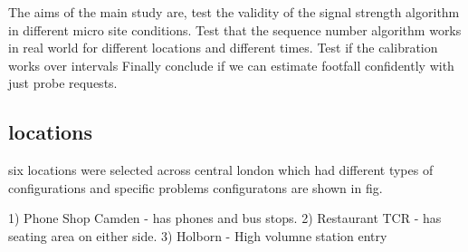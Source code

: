 The aims of the main study are,
test the validity of the signal strength algorithm in different 
micro site conditions.
Test that the sequence number algorithm works in real world
for different locations and different times.
Test if the calibration works over intervals
Finally conclude if we can estimate footfall confidently
with just probe requests.

\subsection{locations}
six locations were selected across central london which
had different types of configurations and specific problems
configuratons are shown in fig.

1) Phone Shop Camden - has phones and bus stops.
2) Restaurant TCR - has seating area on either side.
3) Holborn - High volumne station entry
